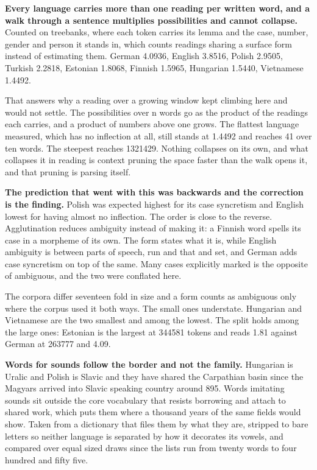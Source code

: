 \textbf{Every language carries more than one reading per written word, and a walk through a sentence multiplies possibilities and cannot collapse.} Counted on treebanks, where each token carries its lemma and the case, number, gender and person it stands in, which counts readings sharing a surface form instead of estimating them. German 4.0936, English 3.8516, Polish 2.9505, Turkish 2.2818, Estonian 1.8068, Finnish 1.5965, Hungarian 1.5440, Vietnamese 1.4492.

That answers why a reading over a growing window kept climbing here and would not settle. The possibilities over n words go as the product of the readings each carries, and a product of numbers above one grows. The flattest language measured, which has no inflection at all, still stands at 1.4492 and reaches 41 over ten words. The steepest reaches 1321429. Nothing collapses on its own, and what collapses it in reading is context pruning the space faster than the walk opens it, and that pruning is parsing itself.

\textbf{The prediction that went with this was backwards and the correction is the finding.} Polish was expected highest for its case syncretism and English lowest for having almost no inflection. The order is close to the reverse. Agglutination reduces ambiguity instead of making it: a Finnish word spells its case in a morpheme of its own. The form states what it is, while English ambiguity is between parts of speech, run and that and set, and German adds case syncretism on top of the same. Many cases explicitly marked is the opposite of ambiguous, and the two were conflated here.

The corpora differ seventeen fold in size and a form counts as ambiguous only where the corpus used it both ways. The small ones understate. Hungarian and Vietnamese are the two smallest and among the lowest. The split holds among the large ones: Estonian is the largest at 344581 tokens and reads 1.81 against German at 263777 and 4.09.

\textbf{Words for sounds follow the border and not the family.} Hungarian is Uralic and Polish is Slavic and they have shared the Carpathian basin since the Magyars arrived into Slavic speaking country around 895. Words imitating sounds sit outside the core vocabulary that resists borrowing and attach to shared work, which puts them where a thousand years of the same fields would show. Taken from a dictionary that files them by what they are, stripped to bare letters so neither language is separated by how it decorates its vowels, and compared over equal sized draws since the lists run from twenty words to four hundred and fifty five.


